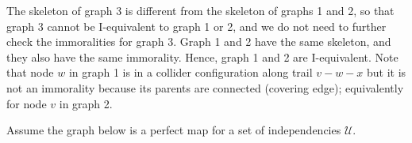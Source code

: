 \begin{exenumerate}
  \hspace{5ex}
  
  \begin{solution}
    The skeleton of graph 3 is different from the skeleton of graphs 1
    and 2, so that graph 3 cannot be I-equivalent to graph 1 or 2, and
    we do not need to further check the immoralities for graph 3. Graph 1 and 2
    have the same skeleton, and they also have the same
    immorality. Hence, graph 1 and 2 are I-equivalent. Note that node
    $w$ in graph 1 is in a collider configuration along trail $v-w-x$
    but it is not an immorality because its parents are connected
    (covering edge); equivalently for node $v$ in graph 2.
    
    \begin{center}
      \hspace{4ex}
    \end{center}
    \end{solution}

\item Assume the graph below is a perfect map for a set of independencies $\mathcal{U}$.


\end{exenumerate}
